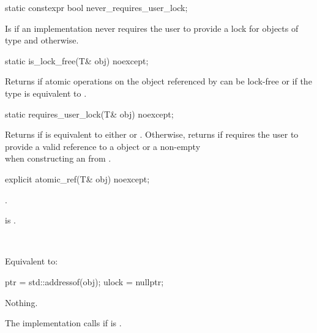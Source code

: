 \begin{addedblock}
\begin{itemdecl}
static constexpr bool never_requires_user_lock;
\end{itemdecl}

\begin{itemdescr}
\pnum
Is  if an implementation never requires the user to provide a 
lock for objects of type  and  otherwise.
\end{itemdescr}


\begin{itemdecl}
static is_lock_free(T& obj) noexcept;
\end{itemdecl}

\begin{itemdescr}
\returns Returns  if atomic operations on the object referenced by
 can be lock-free or if the  type is equivalent to 
.
\end{itemdescr}


\begin{itemdecl}
static requires_user_lock(T& obj) noexcept;
\end{itemdecl}

\begin{itemdescr}
\returns Returns  if  is equivalent to either
 or .
Otherwise, returns  if  requires the user to
provide a valid reference to a  object 
or a non-empty \\  
when constructing an  from . 
\end{itemdescr}
\end{addedblock}


\begin{itemdecl}
explicit atomic_ref(T& obj) noexcept;
\end{itemdecl}

\begin{itemdescr}
\pnum
{}.
\begin{addedblock}
\expects {} is .
\end{addedblock}

\pnum
\effects {}\\
\begin{addedblock}Equivalent to:
\begin{codeblock}
  ptr = std::addressof(obj);
  ulock = nullptr;
\end{codeblock}
\end{addedblock}

\pnum
\throws Nothing.
 
\pnum
\begin{addedblock}
\remarks The implementation calls  if  is .
\end{addedblock}
\end{itemdescr}



